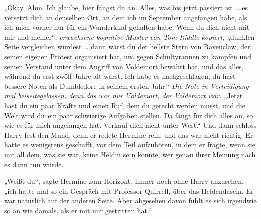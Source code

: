 „Okay. Ähm. Ich glaube, hier fängst du an. Alles, was bis jetzt passiert ist … es versetzt dich an denselben Ort, an dem ich im September angefangen habe, als ich mich vorher nur für ein Wunderkind gehalten habe. Wenn du dich nicht mit mir und meiner“, \emph{erwachsene kognitive Muster von Tom Riddle kopiert,} „dunklen Seite vergleichen würdest … dann wärst du der hellste Stern von Ravenclaw, der seinen eigenen Protest organisiert hat, um gegen Schultyrannen zu kämpfen und seinen Verstand unter dem Angriff von Voldemort bewahrt hat, und das alles, während du erst zwölf Jahre alt warst. Ich habe es nachgeschlagen, du hast bessere Noten als Dumbledore in seinem ersten Jahr.“ \emph{Die Note in Verteidigung mal beiseitegelassen, denn das war nur Voldemort, der Voldemort war.}
„Jetzt hast du ein paar Kräfte und einen Ruf, dem du gerecht werden musst, und die Welt wird dir ein paar schwierige Aufgaben stellen. Da fängt für dich alles an, so wie es für mich angefangen hat. Verkauf dich nicht unter Wert.“ Und dann schloss Harry fest den Mund, denn er redete Hermine rein, und das war nicht richtig. Er hatte es wenigstens geschafft, vor dem Teil aufzuhören, in dem er fragte, wenn sie mit all dem, was sie war, keine Heldin sein konnte, wer genau ihrer Meinung nach es dann tun würde.

„Weißt du“, sagte Hermine zum Horizont, immer noch ohne Harry anzusehen, „ich hatte mal so ein Gespräch mit Professor Quirrell, über das Heldendasein. Er war natürlich auf der anderen Seite. Aber abgesehen davon fühlt es sich irgendwie so an wie damals, als er mit mir gestritten hat.“

